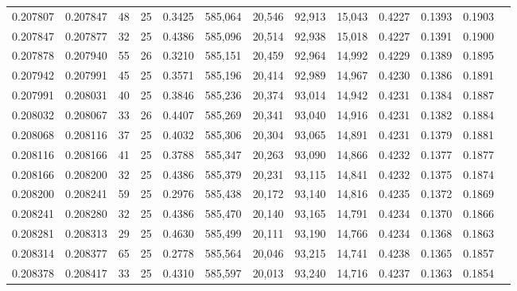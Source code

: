 \begin{tabular}{rrrrrrrrrrrrr}
0.207807 & 0.207847 &  48 &  25 &                                     0.3425 & 585,064 &  20,546 &  92,913 &  15,043 & 0.4227 & 0.1393 & 0.1903 \\
0.207847 & 0.207877 &  32 &  25 &                                     0.4386 & 585,096 &  20,514 &  92,938 &  15,018 & 0.4227 & 0.1391 & 0.1900 \\
0.207878 & 0.207940 &  55 &  26 &                                     0.3210 & 585,151 &  20,459 &  92,964 &  14,992 & 0.4229 & 0.1389 & 0.1895 \\
0.207942 & 0.207991 &  45 &  25 &                                     0.3571 & 585,196 &  20,414 &  92,989 &  14,967 & 0.4230 & 0.1386 & 0.1891 \\
0.207991 & 0.208031 &  40 &  25 &                                     0.3846 & 585,236 &  20,374 &  93,014 &  14,942 & 0.4231 & 0.1384 & 0.1887 \\
0.208032 & 0.208067 &  33 &  26 &                                     0.4407 & 585,269 &  20,341 &  93,040 &  14,916 & 0.4231 & 0.1382 & 0.1884 \\
0.208068 & 0.208116 &  37 &  25 &                                     0.4032 & 585,306 &  20,304 &  93,065 &  14,891 & 0.4231 & 0.1379 & 0.1881 \\
0.208116 & 0.208166 &  41 &  25 &                                     0.3788 & 585,347 &  20,263 &  93,090 &  14,866 & 0.4232 & 0.1377 & 0.1877 \\
0.208166 & 0.208200 &  32 &  25 &                                     0.4386 & 585,379 &  20,231 &  93,115 &  14,841 & 0.4232 & 0.1375 & 0.1874 \\
0.208200 & 0.208241 &  59 &  25 &                                     0.2976 & 585,438 &  20,172 &  93,140 &  14,816 & 0.4235 & 0.1372 & 0.1869 \\
0.208241 & 0.208280 &  32 &  25 &                                     0.4386 & 585,470 &  20,140 &  93,165 &  14,791 & 0.4234 & 0.1370 & 0.1866 \\
0.208281 & 0.208313 &  29 &  25 &                                     0.4630 & 585,499 &  20,111 &  93,190 &  14,766 & 0.4234 & 0.1368 & 0.1863 \\
0.208314 & 0.208377 &  65 &  25 &                                     0.2778 & 585,564 &  20,046 &  93,215 &  14,741 & 0.4238 & 0.1365 & 0.1857 \\
0.208378 & 0.208417 &  33 &  25 &                                     0.4310 & 585,597 &  20,013 &  93,240 &  14,716 & 0.4237 & 0.1363 & 0.1854 \\

\end{tabular}
